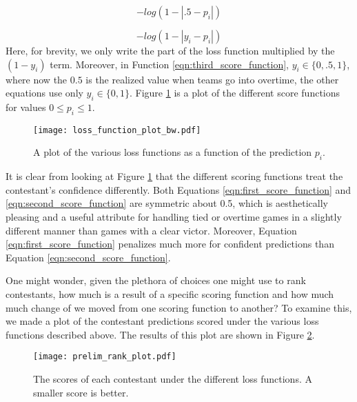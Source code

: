 \begin{equation}\label{eqn:second_score_function}
-log(1-|.5-p_i|)
\end{equation} 

\begin{equation}\label{eqn:third_score_function}
-log(1-|y_i-p_i|)
\end{equation} 
Here, for brevity, we only write the part of the loss function multiplied by the $(1-y_i)$ term. Moreover, in Function \ref{eqn:third_score_function}, $y_i \in \{0,.5,1\}$, where now the $0.5$ is the realized value when teams go into overtime, the other equations use only $y_i \in \{0,1\}$. Figure \ref{fig:scoring_functions} is a plot of the different score functions for values $0\leq p_i \leq 1$.  


\begin{figure}[h]
\centering
\texttt{[image: loss\_function\_plot\_bw.pdf]}
\caption{A plot of the various loss functions as a function of the prediction $p_i$.  }
\label{fig:scoring_functions}
\end{figure}

It is clear from looking at Figure \ref{fig:scoring_functions} that the different scoring functions treat the contestant's confidence differently. Both Equations \ref{eqn:first_score_function} and \ref{eqn:second_score_function} are symmetric about 0.5, which is aesthetically pleasing and a useful attribute for handling tied or overtime games in a slightly different manner than games with a clear victor. Moreover, Equation \ref{eqn:first_score_function} penalizes much more for confident predictions than Equation \ref{eqn:second_score_function}. 

One might wonder, given the plethora of choices one might use to rank contestants, how much is a result of a specific scoring function and how much much change of  we moved from one scoring function to another? To examine this, we made a plot of the contestant predictions scored under the various loss functions described above. The results of this plot are shown in Figure \ref{fig:score_rank_plot}. 

  \begin{figure}[h]
\centering
\texttt{[image: prelim\_rank\_plot.pdf]}
\caption{The scores of each contestant under the different loss functions. A smaller score is better.  }
\label{fig:score_rank_plot}
\end{figure}

